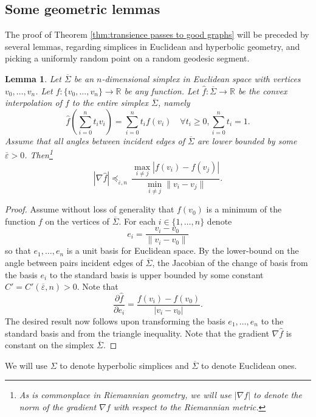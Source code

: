 \documentclass{amsart}
\newcommand{\RR}{\mathbb{R}}
\theoremstyle{plain}
\newtheorem{lemma}[theorem]{Lemma}
\numberwithin{equation}{section}
\theoremstyle{definition}
\begin{document}
\subsection{Some geometric lemmas}

The proof of Theorem \ref{thm:transience passes to good graphs} will be preceded by several lemmas, regarding simplices in Euclidean and hyperbolic geometry, and picking a uniformly random point on a random geodesic segment.


\begin{lemma}
\label{lemma:convex combination on simplex}
Let $\overline{\Sigma}$ be an $n$-dimensional simplex in Euclidean space with vertices $v_0,\ldots,v_n$.  Let $f : \{v_0,\ldots,v_n\} \to \RR$ be any function. Let $\widehat f : \overline{\Sigma} \to \RR$ be the convex interpolation of $f$ to the entire simplex $\overline{\Sigma}$, namely
$$ \widehat{f}(\sum_{i=0}^n t_i v_i) =\sum_{i=0}^n t_i f(v_i) \quad \forall t_i \ge 0, \sum_{i=0}^n t_i =1.$$
Assume that all angles between incident edges of $\overline{\Sigma}$ are lower bounded by some $\overline{\varepsilon} > 0$.
Then\footnote{As is commonplace in Riemannian geometry, we will use $|\nabla f|$ to denote the norm of the gradient $\nabla f$ with respect to the Riemannian metric.}
\begin{equation}
|\nabla \widehat f| \preceq_{\overline \varepsilon, n} \, \frac{\max_{i\neq j} |f(v_i) - f(v_j)|}{\min_{i\neq j}\|v_i-v_j\|}.
\end{equation}
\end{lemma}
\begin{proof}
Assume without loss of generality that $f(v_0)$ is a minimum of the function $f$ on the vertices of $\overline{\Sigma}$. For each $i \in \{1,\ldots,n\}$ denote
$$ e_i = \frac{v_i - v_0}{\|v_i-v_0\|}$$
so that $e_1,\ldots,e_n$ is a unit basis for Euclidean space. By the lower-bound on the angle between pairs incident edges of $\overline{\Sigma}$, the Jacobian of the change of basis from the basis $e_i$ to the standard basis is upper bounded by some constant $C'=C'(\overline{\varepsilon},n) > 0$. Note that 
$$ \frac{\partial \widehat{f}}{\partial e_i} = \frac{f(v_i) - f(v_0)}{|v_i-v_0|}.$$
The desired result now follows upon transforming the basis $e_1,\ldots,e_n$ to the standard basis and from the triangle inequality. Note that the gradient $\nabla \widehat f$ is constant on the simplex $\overline{\Sigma}$.
\end{proof}

We will use $\Sigma$ to denote  hyperbolic simplices and $\overline \Sigma$ to denote Euclidean ones.
\end{document}
